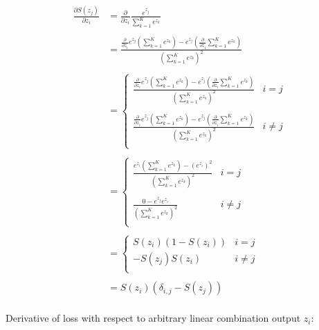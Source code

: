\begin{align*}
    \frac{\partial S(z_j) }{\partial z_i} &= \frac{\partial}{\partial z_i} \frac{e^{z_j}}{\sum^{K}_{k=1}e^{z_k}}\\\\
    &= \frac{\frac{\partial}{\partial z_i} e^{z_j} (\sum^{K}_{k=1}e^{z_k}) - e^{z_j} (\frac{\partial}{\partial z_i} \sum^{K}_{k=1}e^{z_k})}{(\sum^{K}_{k=1}e^{z_k})^2}\\\\
    &= 
    \begin{cases}
        \frac{\frac{\partial}{\partial z_i} e^{z_j} (\sum^{K}_{k=1}e^{z_k}) - e^{z_j} (\frac{\partial}{\partial z_i} \sum^{K}_{k=1}e^{z_k})}{(\sum^{K}_{k=1}e^{z_k})^2} & i = j\\\\
        \frac{\frac{\partial}{\partial z_i} e^{z_j} (\sum^{K}_{k=1}e^{z_k}) - e^{z_j} (\frac{\partial}{\partial z_i} \sum^{K}_{k=1}e^{z_k})}{(\sum^{K}_{k=1}e^{z_k})^2} & i \neq j\\
    \end{cases}\\\\
    &=
    \begin{cases}
        \frac{e^{z_i} (\sum^{K}_{k=1}e^{z_k}) - (e^{z_i})^2 }{(\sum^{K}_{k=1}e^{z_k})^2} & i = j\\\\
        \frac{0 - e^{z_j}e^{z_i} }{(\sum^{K}_{k=1}e^{z_k})^2} & i \neq j\\
    \end{cases}\\\\
    &=
    \begin{cases}
        S(z_i)(1 - S(z_i)) & i = j\\
        -S(z_j)S(z_i) & i \neq j\\
    \end{cases}\\\\
    &= S(z_i)(\delta_{i,j} - S(z_j)) \\
\end{align*}

Derivative of loss with respect to arbitrary linear combination output $z_i$:\\ 

